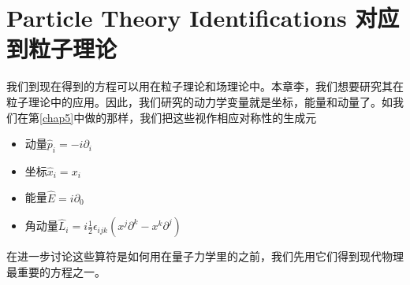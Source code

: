 \section[对应到粒子理论]{Particle Theory Identifications 对应到粒子理论}\label{sec8.1}
我们到现在得到的方程可以用在粒子理论和场理论中。本章李，我们想要研究其在粒子理论中的应用。因此，我们研究的动力学变量就是坐标，能量和动量了。如我们在第\ref{chap5}中做的那样，我们把这些视作相应对称性的生成元
\begin{itemize}
\item 动量$\hat{p}_i=-i\partial_i$\\
\item 坐标$\hat{x}_i=x_i$\\
\item 能量$\hat{E}=i\partial_0$\\
\item 角动量$\hat{L}_i=i\frac{1}{2}\epsilon_{ijk}(x^j\partial^k-x^k\partial^j)$
\end{itemize}

在进一步讨论这些算符是如何用在量子力学里的之前，我们先用它们得到现代物理最重要的方程之一。
